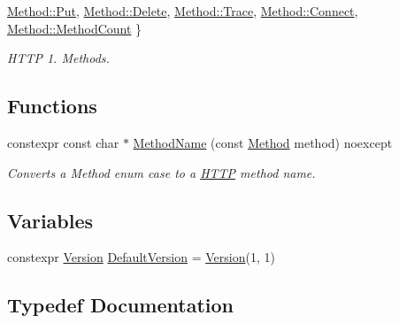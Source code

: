 \begin{DoxyCompactItemize}
\mbox{\hyperlink{namespaceo_z_1_1_h_t_t_p_a02d8497e4abbb0adf3af0fe9fad1b7a6ad0bf1810982e9728fcf3ac444a015373}{Method\+::\+Put}}, 
\mbox{\hyperlink{namespaceo_z_1_1_h_t_t_p_a02d8497e4abbb0adf3af0fe9fad1b7a6af2a6c498fb90ee345d997f888fce3b18}{Method\+::\+Delete}}, 
\mbox{\hyperlink{namespaceo_z_1_1_h_t_t_p_a02d8497e4abbb0adf3af0fe9fad1b7a6add4ec0ac4e58f7c32a01244ae91150b1}{Method\+::\+Trace}}, 
\newline
\mbox{\hyperlink{namespaceo_z_1_1_h_t_t_p_a02d8497e4abbb0adf3af0fe9fad1b7a6a49ab28040dfa07f53544970c6d147e1e}{Method\+::\+Connect}}, 
\mbox{\hyperlink{namespaceo_z_1_1_h_t_t_p_a02d8497e4abbb0adf3af0fe9fad1b7a6a501c78dd7462ae9cb997f05db181379a}{Method\+::\+Method\+Count}}
 \}
\begin{DoxyCompactList}\small\item\em H\+T\+TP 1. Methods. \end{DoxyCompactList}\end{DoxyCompactItemize}
\subsection*{Functions}
\begin{DoxyCompactItemize}
\item 
constexpr const char $\ast$ \mbox{\hyperlink{namespaceo_z_1_1_h_t_t_p_a34bd18b4f1bf5cfa84672c2f8b81801e}{Method\+Name}} (const \mbox{\hyperlink{namespaceo_z_1_1_h_t_t_p_a02d8497e4abbb0adf3af0fe9fad1b7a6}{Method}} method) noexcept
\begin{DoxyCompactList}\small\item\em Converts a Method enum case to a \mbox{\hyperlink{namespaceo_z_1_1_h_t_t_p}{H\+T\+TP}} method name. \end{DoxyCompactList}\end{DoxyCompactItemize}
\subsection*{Variables}
\begin{DoxyCompactItemize}
\item 
constexpr \mbox{\hyperlink{structo_z_1_1_h_t_t_p_1_1_version}{Version}} \mbox{\hyperlink{namespaceo_z_1_1_h_t_t_p_af1d13b042d8595fb3196ce91c5c4955d}{Default\+Version}} = \mbox{\hyperlink{structo_z_1_1_h_t_t_p_1_1_version}{Version}}(1, 1)
\end{DoxyCompactItemize}


\subsection{Typedef Documentation}
\mbox{\label{namespaceo_z_1_1_h_t_t_p_a270c38b9f9b6228ce430fda6d5b150d6}} 
